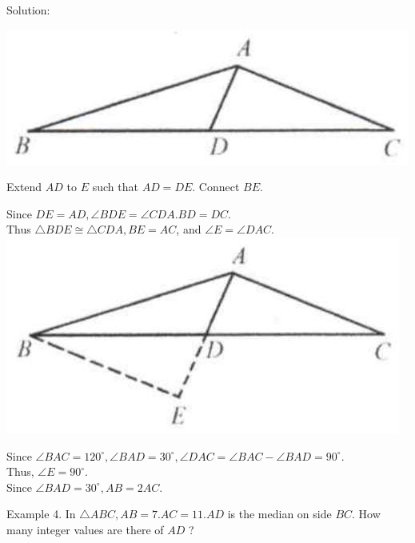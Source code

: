 \documentclass[10pt]{article}
\begin{document}
Solution:
\begin{center}
\includegraphics[max width=\textwidth]{2025_04_17_97bc1f7e44d93c271a88g-024(4)}
\end{center}

Extend \(A D\) to \(E\) such that \(A D=D E\). Connect \(B E\).

Since \(D E=A D, \angle B D E=\angle C D A . B D=D C\).\\
Thus \(\triangle B D E \cong \triangle C D A, B E=A C\), and \(\angle E=\angle D A C\).\\
\includegraphics[max width=\textwidth, center]{2025_04_17_97bc1f7e44d93c271a88g-024}

Since \(\angle B A C=120^{\circ}, \angle B A D=30^{\circ}, \angle D A C=\angle B A C-\angle B A D=90^{\circ}\).\\
Thus, \(\angle E=90^{\circ}\).\\
Since \(\angle B A D=30^{\circ}, A B=2 A C\).

Example 4. In \(\triangle A B C, A B=7 . A C=11 . A D\) is the median on side \(B C\). How many integer values are there of \(A D\) ?
\end{document}
